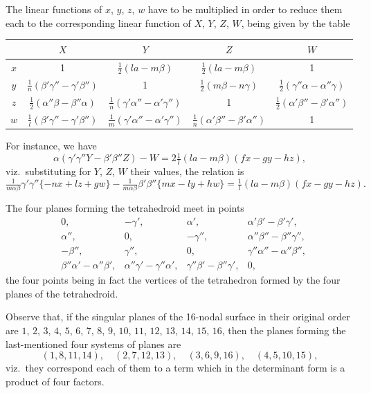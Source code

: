 \documentclass[11pt,a4paper]{article}
\begin{document}
\clearpage
The linear functions of $x$, $y$, $z$, $w$ have to be multiplied in order to reduce them each to the corresponding linear function of $X$, $Y$, $Z$, $W$, being given by the table
\begin{center}
\begin{tabular}{c|cccc}
& $X$ & $Y$ & $Z$ & $W$ \\
\hline
$x$ & 1 & $\frac{1}{2}(la - m\beta)$ & $\frac{1}{2}(la - m\beta)$ & 1 \\
$y$ & $\frac{1}{n}(\beta'\gamma'' - \gamma'\beta'')$ & 1 & $\frac{1}{2}(m\beta - n\gamma)$ & $\frac{1}{2}(\gamma''\alpha - \alpha''\gamma)$ \\
$z$ & $\frac{1}{2}(\alpha''\beta - \beta''\alpha)$ & $\frac{1}{n}(\gamma'\alpha'' - \alpha'\gamma'')$ & 1 & $\frac{1}{2}(\alpha'\beta'' - \beta'\alpha'')$ \\
$w$ & $\frac{1}{l}(\beta'\gamma'' - \gamma'\beta'')$ & $\frac{1}{m}(\gamma'\alpha'' - \alpha'\gamma'')$ & $\frac{1}{n}(\alpha'\beta'' - \beta'\alpha'')$ & 1
\end{tabular}
\end{center}
For instance, we have
\[
\alpha(\gamma'\gamma''Y - \beta'\beta''Z) - W = 2\tfrac{1}{l}(la - m\beta)(fx - gy - hz),
\]
viz.\ substituting for $Y$, $Z$, $W$ their values, the relation is
\[
\tfrac{1}{m\alpha\beta}\gamma'\gamma''\{-nx + lz + gw\} - \tfrac{1}{m\alpha\beta}\beta'\beta''\{mx - ly + hw\} = \tfrac{1}{l}(la - m\beta)(fx - gy - hz).
\]

\clearpage
The four planes forming the tetrahedroid meet in points
\begin{align*}
& 0, & -\gamma', & \alpha', & \alpha'\beta' - \beta'\gamma', \\
& \alpha'', & 0, & -\gamma'', & \alpha''\beta'' - \beta''\gamma'', \\
& -\beta'', & \gamma'', & 0, & \gamma''\alpha'' - \alpha''\beta'', \\
& \beta''\alpha' - \alpha''\beta', & \alpha''\gamma' - \gamma''\alpha', & \gamma''\beta' - \beta''\gamma', & 0,
\end{align*}
the four points being in fact the vertices of the tetrahedron formed by the four planes of the tetrahedroid.

Observe that, if the singular planes of the 16-nodal surface in their original order are $1$, $2$, $3$, $4$, $5$, $6$, $7$, $8$, $9$, $10$, $11$, $12$, $13$, $14$, $15$, $16$, then the planes forming the last-mentioned four systems of planes are
\[
(1, 8, 11, 14), \quad (2, 7, 12, 13), \quad (3, 6, 9, 16), \quad (4, 5, 10, 15),
\]
viz.\ they correspond each of them to a term which in the determinant form is a product of four factors.
\end{document}
